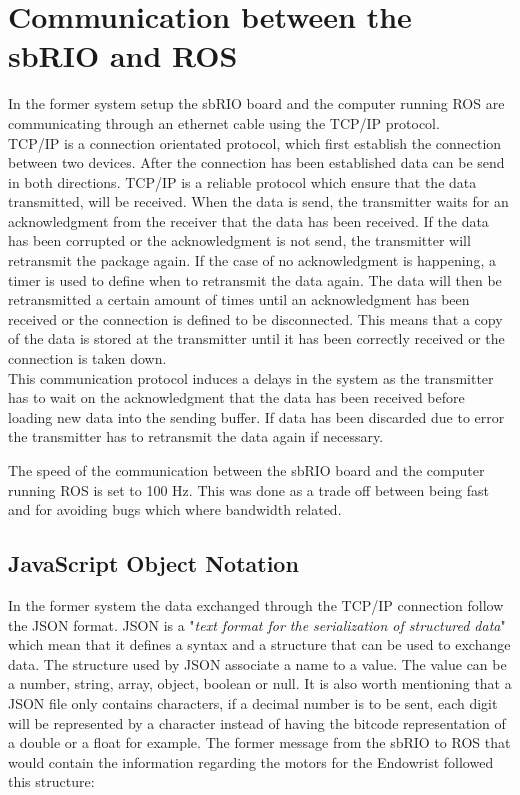 \section{Communication between the sbRIO and ROS}\label{sec:com_ROS_sbRIO}


In the former system setup the sbRIO board and the computer running ROS are communicating through an ethernet cable using the TCP/IP protocol.\\ 

TCP/IP is a connection orientated protocol, which first establish the connection between two devices\cite{TCP_IP_UDP}. After the connection has been established data can be send in both directions. TCP/IP is a reliable protocol which ensure that the data transmitted, will be received. When the data is send, the transmitter waits for an acknowledgment from the receiver that the data has been received. If the data has been corrupted or the acknowledgment is not send, the transmitter will retransmit the package again. If the case of no acknowledgment is happening, a timer is used to define when to retransmit the data again. The data will then be retransmitted a certain amount of times until an acknowledgment has been received or the connection is defined to be disconnected. This means that a copy of the data is stored at the transmitter until it has been correctly received or the connection is taken down.\\
This communication protocol induces a delays in the system as the transmitter has to wait on the acknowledgment that the data has been received before loading new data into the sending buffer. If data has been discarded due to error the transmitter has to retransmit the data again if necessary.  

The speed of the communication between the sbRIO board and the computer running ROS is set to 100 Hz. This was done as a trade off between being fast and for avoiding bugs which where bandwidth related\cite{Chris_Surgical}.

\subsection*{JavaScript Object Notation}\label{subsec:JSON}
In the former system the data exchanged through the TCP/IP connection follow the \gls{JSON} format. \gls{JSON} is a "\textit{text format for the serialization of structured data}"\cite{JSON_IETF} which mean that it defines a syntax and a structure that can be used to exchange data. The structure used by \gls{JSON} associate a name to a value. The value can be a number, string, array, object, boolean or null. It is also worth mentioning that a \gls{JSON} file only contains characters, if a decimal number is to be sent, each digit will be represented by a character instead of having the bitcode representation of a double or a float for example. The former message from the sbRIO to ROS that would contain the information regarding the motors for the Endowrist followed this structure:

